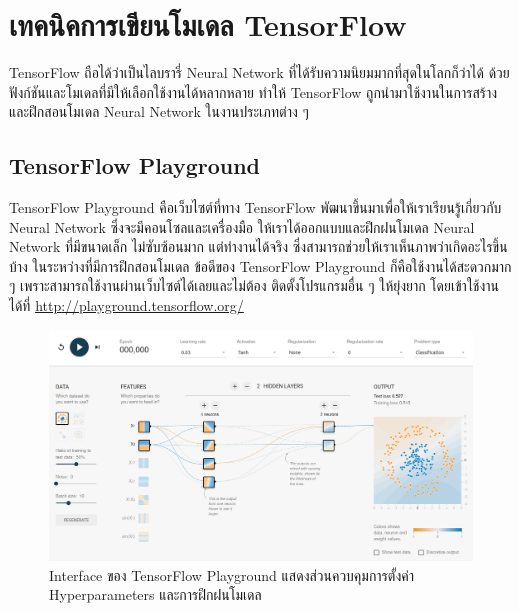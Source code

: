 

\section{เทคนิคการเขียนโมเดล TensorFlow}
\label{ap:coding_tf}

TensorFlow ถือได้ว่าเป็นไลบรารี่ Neural Network ที่ได้รับความนิยมมากที่สุดในโลกก็ว่าได้ ด้วยฟังก์ชันและโมเดลที่มีให้เลือกใช้งานได้หลากหลาย
ทำให้ TensorFlow ถูกนำมาใช้งานในการสร้างและฝึกสอนโมเดล Neural Network ในงานประเภทต่าง ๆ

\subsection{TensorFlow Playground}

TensorFlow Playground คือเว็บไซต์ที่ทาง TensorFlow พัฒนาขึ้นมาเพื่อให้เราเรียนรู้เกี่ยวกับ Neural Network ซึ่งจะมีคอนโซลและเครื่องมือ%
ให้เราได้ออกแบบและฝึกฝนโมเดล Neural Network ที่มีขนาดเล็ก ไม่ซับซ้อนมาก แต่ทำงานได้จริง ซึ่งสามารถช่วยให้เราเห็นภาพว่าเกิดอะไรขึ้นบ้าง%
ในระหว่างที่มีการฝึกสอนโมเดล ข้อดีของ TensorFlow Playground ก็คือใช้งานได้สะดวกมาก ๆ เพราะสามารถใช้งานผ่านเว็บไซต์ได้เลยและไม่ต้อง%
ติดตั้งโปรแกรมอื่น ๆ ให้ยุ่งยาก โดยเข้าใช้งานได้ที่ \url{http://playground.tensorflow.org/}

\begin{figure}[htbp]
    \centering
    \includegraphics[width=\linewidth]{fig/tf-playground.png}
    \caption{Interface ของ TensorFlow Playground แสดงส่วนควบคุมการตั้งค่า Hyperparameters และการฝึกฝนโมเดล}
    \label{fig:tf_playground}
\end{figure}

